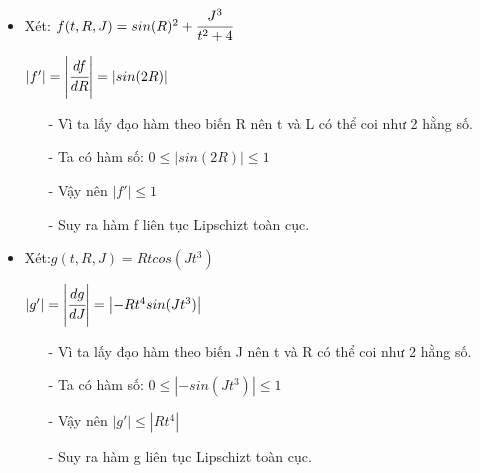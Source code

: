 \documentclass[a4paper]{article}
\begin{document}
\begin{enumerate}
\begin{itemize}
            \item Xét: $f(t,R,J) = sin(R)^2 + \cfrac{J^3}{t^2+4}$ 
            \begin{center}
                $\left|f'\right| = \left|\cfrac{df}{dR}\right| = \left|sin(2R)\right| $\\
            \end{center}
            \begin{itemize}
                \item[-] Vì ta lấy đạo hàm theo biến R nên t và L có thể coi như 2 hằng số.
                \item[-] Ta có hàm số: $0\leq \left|sin(2R)\right| \leq 1$
                \item[-] Vậy nên $\left|f'\right| \leq 1$
                \item[-] Suy ra hàm f liên tục Lipschizt toàn cục.
            \end{itemize}
            \item Xét:$g(t,R,J) = Rtcos(Jt^3)$
            \begin{center}
                $\left|g'\right| = \left|\cfrac{dg}{dJ}\right| = \left|-Rt^4sin(Jt^3)\right|$\\
            \end{center}
            \begin{itemize}
                \item[-] Vì ta lấy đạo hàm theo biến J nên t và R có thể coi như 2 hằng số.
                \item[-] Ta có hàm số: $0\leq \left|-sin(Jt^3)\right| \leq 1$
                \item[-] Vậy nên $\left|g'\right| \leq \left|Rt^4\right|$
                \item[-] Suy ra hàm g liên tục Lipschizt toàn cục.
            \end{itemize}
        \end{itemize}



\end{enumerate}
\end{document}
